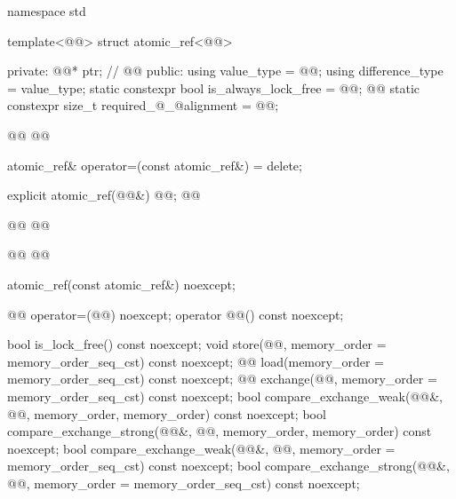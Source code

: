 \begin{codeblock}
namespace std {
  template<@@> struct atomic_ref<@@> {
  private:
    @@* ptr;  // \expos
    @@
  public:
    using value_type = @@;
    using difference_type = value_type;
    static constexpr bool is_always_lock_free = @@;
    @@
    static constexpr size_t required_@_@alignment = @@;

    @@
    @@

    atomic_ref& operator=(const atomic_ref&) = delete;

    explicit atomic_ref(@@&) @@;
    @@
    
    @@
    @@
    
    @@
    @@

    atomic_ref(const atomic_ref&) noexcept;

    @@ operator=(@@) noexcept;
    operator @@() const noexcept;

    bool is_lock_free() const noexcept;
    void store(@@, memory_order = memory_order_seq_cst) const noexcept;
    @@ load(memory_order = memory_order_seq_cst) const noexcept;
    @@ exchange(@@,
                            memory_order = memory_order_seq_cst) const noexcept;
    bool compare_exchange_weak(@@&, @@,
                               memory_order, memory_order) const noexcept;
    bool compare_exchange_strong(@@&, @@,
                                 memory_order, memory_order) const noexcept;
    bool compare_exchange_weak(@@&, @@,
                               memory_order = memory_order_seq_cst) const noexcept;
    bool compare_exchange_strong(@@&, @@,
                                 memory_order = memory_order_seq_cst) const noexcept;

}}
\end{codeblock}
